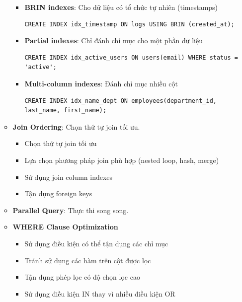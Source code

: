 \begin{enumerate}
\begin{itemize}
\begin{itemize}
            \item \textbf{BRIN indexes}: Cho dữ liệu có tổ chức tự nhiên (timestamps)
\begin{lstlisting}[style=sql, caption=Ví dụ sử dụng BRIN indexes trong Postgres, label=sql:example]
CREATE INDEX idx_timestamp ON logs USING BRIN (created_at);
\end{lstlisting}

            \item \textbf{Partial indexes}: Chỉ đánh chỉ mục cho một phần dữ liệu
\begin{lstlisting}[style=sql, caption=Ví dụ sử dụng Partial indexes trong Postgres, label=sql:example]
CREATE INDEX idx_active_users ON users(email) WHERE status = 'active';
\end{lstlisting}

            \item \textbf{Multi-column indexes}: Đánh chỉ mục nhiều cột
\begin{lstlisting}[style=sql, caption=Ví dụ sử dụng Multi-column indexes trong Postgres, label=sql:example]
CREATE INDEX idx_name_dept ON employees(department_id, last_name, first_name);
\end{lstlisting}
        \end{itemize}
        \item \textbf{Join Ordering}: Chọn thứ tự join tối ưu.

\begin{itemize}
    \item Chọn thứ tự join tối ưu
    \item Lựa chọn phương pháp join phù hợp (nested loop, hash, merge)
    \item Sử dụng join column indexes
    \item Tận dụng foreign keys
\end{itemize}

        \item \textbf{Parallel Query}: Thực thi song song.
        \item \textbf{WHERE Clause Optimization}

\begin{itemize}
    \item Sử dụng điều kiện có thể tận dụng các chỉ mục
    \item Tránh sử dụng các hàm trên cột được lọc
    \item Tận dụng phép lọc có độ chọn lọc cao
    \item Sử dụng điều kiện IN thay vì nhiều điều kiện OR
\end{itemize}


\end{itemize}
\end{enumerate}
